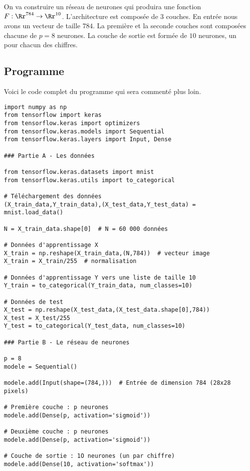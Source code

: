 \documentclass[11pt,class=report,crop=false]{standalone}
\begin{document}
On va construire un réseau de neurones qui produira une fonction $F : \Rr^{784} \to \Rr^{10}$. L'architecture est composée de $3$ couches. En entrée nous avons un vecteur de taille $784$. La première et la seconde couches sont composées chacune de $p=8$ neurones. La couche de sortie est formée de $10$ neurones, un pour chacun des chiffres.


\subsection{Programme}

Voici le code complet du programme qui sera commenté plus loin.


\begin{lstlisting}
import numpy as np
from tensorflow import keras
from tensorflow.keras import optimizers
from tensorflow.keras.models import Sequential
from tensorflow.keras.layers import Input, Dense

### Partie A - Les données

from tensorflow.keras.datasets import mnist
from tensorflow.keras.utils import to_categorical

# Téléchargement des données
(X_train_data,Y_train_data),(X_test_data,Y_test_data) = mnist.load_data()

N = X_train_data.shape[0]  # N = 60 000 données

# Données d'apprentissage X
X_train = np.reshape(X_train_data,(N,784))  # vecteur image
X_train = X_train/255  # normalisation

# Données d'apprentissage Y vers une liste de taille 10
Y_train = to_categorical(Y_train_data, num_classes=10) 

# Données de test
X_test = np.reshape(X_test_data,(X_test_data.shape[0],784))
X_test = X_test/255
Y_test = to_categorical(Y_test_data, num_classes=10)

### Partie B - Le réseau de neurones

p = 8
modele = Sequential()

modele.add(Input(shape=(784,)))  # Entrée de dimension 784 (28x28 pixels)

# Première couche : p neurones
modele.add(Dense(p, activation='sigmoid'))

# Deuxième couche : p neurones
modele.add(Dense(p, activation='sigmoid'))

# Couche de sortie : 1O neurones (un par chiffre)
modele.add(Dense(10, activation='softmax'))


\end{lstlisting}
\end{document}
